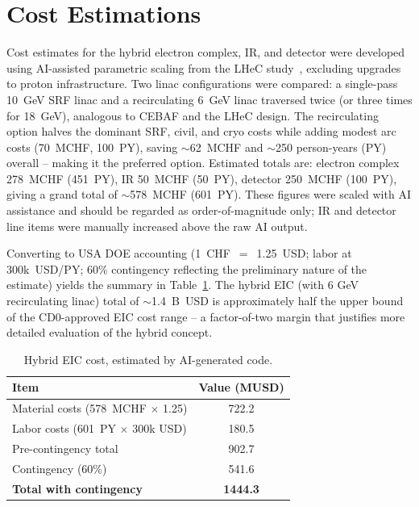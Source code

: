 \documentclass[%
               refpage,       %
               biblatex,     %
               hyphens,      %
               ]{jacow}
\begin{document}
\section{Cost Estimations}

Cost estimates for the hybrid electron complex, IR, and detector were 
developed using AI-assisted parametric scaling from the LHeC  study~\cite{LHeC-costs}, excluding upgrades to proton infrastructure. 
Two linac configurations were compared: a single-pass 10~GeV SRF linac 
and a recirculating 6~GeV linac traversed twice (or three times for 
18~GeV), analogous to CEBAF and the LHeC design. The recirculating option 
halves the dominant SRF, civil, and cryo costs while adding modest 
arc costs (70~MCHF, 100~PY), saving $\sim$62~MCHF and $\sim$250 
person-years (PY) overall -- making it the preferred option. 
Estimated totals are: electron complex 278~MCHF (451~PY), IR 50~MCHF 
(50~PY), detector 250~MCHF (100~PY), giving a grand total of 
$\sim$578~MCHF (601~PY). These figures were scaled with AI assistance 
and should be regarded as order-of-magnitude only; IR and detector 
line items were manually increased above the raw AI output.

Converting to USA DOE accounting (1~CHF~$=$~1.25~USD; labor at 
300k~USD/PY; 60\% contingency reflecting the preliminary nature of the 
estimate) yields the summary in Table~\ref{tab:cost-doe}. The hybrid EIC  (with 6 GeV recirculating linac) total of 
$\sim$1.4~B~USD is approximately half the upper bound of the CD0-approved 
EIC cost range -- a factor-of-two margin that justifies more detailed 
evaluation of the hybrid concept.

\begin{table}[!hbt]
\centering
\caption{Hybrid EIC cost, estimated by AI-generated code.}
\label{tab:cost-doe}
\begin{tabular}{lc}
\toprule
\textbf{Item} & \textbf{Value (MUSD)} \\
\midrule
Material costs (578~MCHF $\times$ 1.25)  & 722.2 \\
Labor costs (601~PY $\times$ 300k USD)   & 180.5 \\
Pre-contingency total                    & 902.7 \\
Contingency (60\%)                       & 541.6 \\
\textbf{Total with contingency}          & \textbf{1444.3} \\
\bottomrule
\end{tabular}
\end{table}
\end{document}
